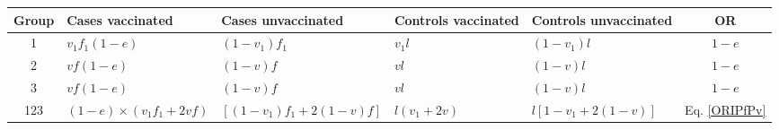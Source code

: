 \begin{tabular}{cp{6em}p{6em}p{5em}p{6em}c}
\toprule
Group & Cases vaccinated & Cases unvaccinated & Controls vaccinated & Controls unvaccinated & OR \\
\midrule
1 & $v_1f_1(1-e)$ & $(1-v_1)f_1$ & $v_1l$ & $(1-v_1)l$ & $1 - e$ \\
2 & $vf(1-e)$ & $(1-v)f$ & $vl$ & $(1-v)l$ & $1 - e$ \\
3 & $vf(1-e)$ & $(1-v)f$ & $vl$ & $(1-v)l$ & $1 - e$ \\
123 & $(1-e)\times(v_1f_1+2vf)$ & $[(1-v_1)f_1+2(1-v)f]$ & $l(v_1+2v)$ & $l[1-v_1+2(1-v)]$ & Eq. \ref{ORIPfPv} \\
\bottomrule
\end{tabular}
